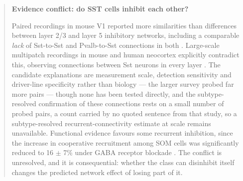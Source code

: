 \documentclass[11pt]{article}
\begin{document}
\begin{quote}
\noindent\textbf{Evidence conflict: do SST cells inhibit each other?}\par
Paired recordings in mouse V1 reported more similarities than differences between layer 2/3 and layer 5 inhibitory networks, including a comparable \emph{lack} of Sst-to-Sst and Pvalb-to-Sst connections in both \citep{Pfeffer2013}. Large-scale multipatch recordings in mouse and human neocortex explicitly contradict this, observing connections between Sst neurons in every layer \citep{Campagnola2022}. The candidate explanations are measurement scale, detection sensitivity and driver-line specificity rather than biology --- the larger survey probed far more pairs --- though none has been tested directly, and the subtype-resolved confirmation of these connections rests on a small number of probed pairs, a count carried by no quoted sentence from that study, so a subtype-resolved recurrent-connectivity estimate at scale remains unavailable. Functional evidence favours some recurrent inhibition, since the increase in cooperative recruitment among SOM cells was significantly reduced to 16 $\pm$ 7\% under GABA receptor blockade \citep{Karnani2016}. The conflict is unresolved, and it is consequential: whether the class can disinhibit itself changes the predicted network effect of losing part of it.

\end{quote}
\end{document}
